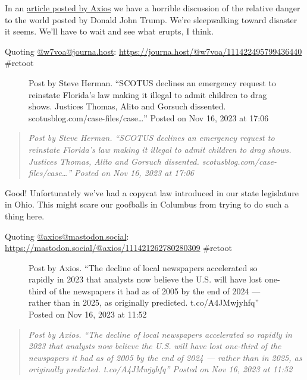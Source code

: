 In an
\href{https://www.axios.com/2023/11/16/economist-trump-2024-presidential?utm_source=twitter&utm_medium=social&utm_campaign=editorial}{article
posted by Axios} we have a horrible discussion of the relative danger to
the world posted by Donald John Trump. We're sleepwalking toward
disaster it seems. We'll have to wait and see what erupts, I think.

Quoting \href{https://journa.host/@w7voa/}{@w7voa@journa.host}:
\url{https://journa.host/@w7voa/111422495799436440} \#retoot

\begin{figure}
\centering
{}
\caption{Post by Steve Herman. ``SCOTUS declines an emergency request to
reinstate Florida's law making it illegal to admit children to drag
shows. Justices Thomas, Alito and Gorsuch dissented.
scotusblog.com/case-files/case\ldots{}'' Posted on Nov 16, 2023 at
17:06}
\end{figure}

\begin{quote}
\emph{Post by Steve Herman. ``SCOTUS declines an emergency request to
reinstate Florida's law making it illegal to admit children to drag
shows. Justices Thomas, Alito and Gorsuch dissented.
scotusblog.com/case-files/case\ldots{}'' Posted on Nov 16, 2023 at
17:06}
\end{quote}

Good! Unfortunately we've had a copycat law introduced in our state
legislature in Ohio. This might scare our goofballs in Columbus from
trying to do such a thing here.

Quoting \href{https://mastodon.social/@axios/}{@axios@mastodon.social}:
\url{https://mastodon.social/@axios/111421262780280309} \#retoot

\begin{figure}
\centering
{}
\caption{Post by Axios. ``The decline of local newspapers accelerated so
rapidly in 2023 that analysts now believe the U.S. will have lost
one-third of the newspapers it had as of 2005 by the end of 2024 ---
rather than in 2025, as originally predicted. t.co/A4JMwjyhfq'' Posted
on Nov 16, 2023 at 11:52}
\end{figure}

\begin{quote}
\emph{Post by Axios. ``The decline of local newspapers accelerated so
rapidly in 2023 that analysts now believe the U.S. will have lost
one-third of the newspapers it had as of 2005 by the end of 2024 ---
rather than in 2025, as originally predicted. t.co/A4JMwjyhfq'' Posted
on Nov 16, 2023 at 11:52}
\end{quote}

